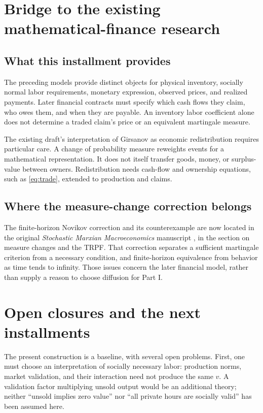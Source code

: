 \documentclass[11pt,letterpaper]{article}
\begin{document}
\section{Bridge to the existing mathematical-finance research}
\subsection{What this installment provides}
The preceding models provide distinct objects for physical inventory,
socially normal labor requirements, monetary expression, observed
prices, and realized payments. Later financial contracts must specify
which cash flows they claim, who owes them, and when they are payable.
An inventory labor coefficient alone does not determine a traded claim's
price or an equivalent martingale measure.

The existing draft's interpretation of Girsanov as economic redistribution
requires particular care. A change of probability measure reweights
events for a mathematical representation. It does not itself transfer
goods, money, or surplus-value between owners. Redistribution needs
cash-flow and ownership equations, such as \eqref{eq:trade}, extended
to production and claims.

\subsection{Where the measure-change correction belongs}
The finite-horizon Novikov correction and its counterexample are now
located in the original \emph{Stochastic Marxian Macroeconomics}
manuscript \cite{prior}, in the section on measure changes and the TRPF.
That correction separates a sufficient martingale criterion from a
necessary condition, and finite-horizon equivalence from behavior as
time tends to infinity. Those issues concern the later financial model,
rather than supply a reason to choose diffusion for Part I.

\section{Open closures and the next installments}
The present construction is a baseline, with several open problems.
First, one must choose an interpretation of socially necessary labor:
production norms, market validation, and their interaction need not
produce the same $v$. A validation factor multiplying unsold output
would be an additional theory; neither ``unsold implies zero value''
nor ``all private hours are socially valid'' has been assumed here.
\end{document}
